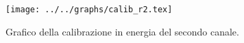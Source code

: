 \begin{figure}[h] \centering\texttt{[image: ../../graphs/calib\_r2.tex]}\caption{Grafico della calibrazione in energia del secondo canale.}\label{gr:calib_r2} \end{figure}
